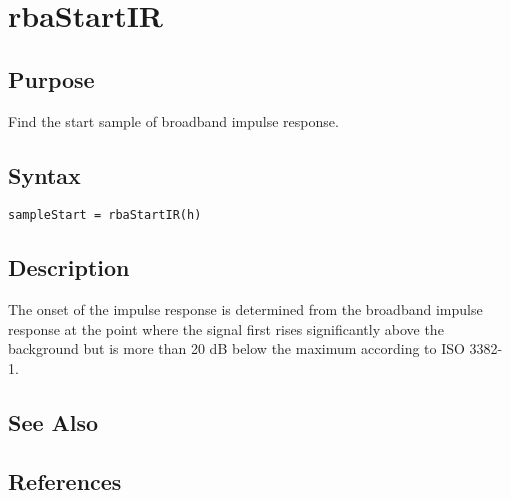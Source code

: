 
\chapter{rbaStartIR} %
\label{cha:rbaStartIR} %

\section{Purpose} %
\label{sec:rbaStartIR_purpose}
Find the start sample of broadband impulse response.


\section{Syntax} %
\label{sec:rbaStartIR_syntax}


\texttt{sampleStart = rbaStartIR(h)}


\section{Description} %
\label{sec:rbaStartIR_description}

The onset of the impulse response is determined from
the broadband impulse response at the point where the signal first rises
significantly above the background but is more than 20 dB below the
maximum according to ISO 3382-1.


\section{See Also} %
\label{sec:rbaStartIR_see_also}

\texttt{}


\section{References} %
\label{sec:rbaStartIR_references}



